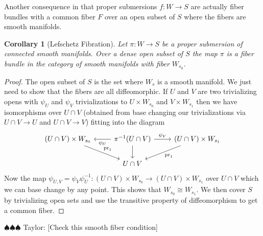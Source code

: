 \documentclass[12pt]{book}
\newcommand{\taylor}[1]{{\color{blue} \sf $\spadesuit\spadesuit\spadesuit$ Taylor: [#1]}}
\numberwithin{equation}{section}
\newtheorem{corollary}[theorem]{Corollary}
\theoremstyle{definition}
\theoremstyle{remark}
\newcommand{\pr}{\operatorname{pr}}
\begin{document}
Another consequence in that proper submersions $f:W \to S$ are actually fiber bundles with a common fiber $F$ over an open subset of $S$ where the fibers are smooth manifolds. 
\begin{corollary}[Lefschetz Fibration]
	Let $\pi:W\to S$ be a proper submersion of connected smooth manifolds. 
	Over a dense open subset of $S$ the map $\pi$ is a fiber bundle in the category of smooth manifolds with fiber $W_{s_0}$. 
\end{corollary}
\begin{proof}
	The open subset of $S$ is the set where $W_{s}$ is a smooth manifold. 
	We just need to show that the fibers are all diffeomorphic. 
	If $U$ and $V$ are two trivializing opens with $\psi_U$ and $\psi_V$ trivializations to $U\times W_{s_0}$ and $V \times W_{s_1}$ then we have isomorphisms over $U\cap V$ (obtained from base changing our trivializations via $U\cap V \to U$ and $U\cap V \to V$) 
	fitting into the diagram
	$$\begin{tikzcd}
	(U\cap V) \times W_{s_0} \ar[dr,"\pr_1"]&\pi^{-1}(U\cap V)\ar[d] \ar[r, "\psi_V"]  \ar[l, "\psi_U"]  & (U\cap V)\times W_{s_1} \ar[dl,"\pr_1"]\\
	& U \cap V &
	\end{tikzcd}
	$$
	Now the map $\psi_{U,V} = \psi_V\psi_U^{-1}:( U\cap V)\times W_{s_0} \to (U\cap V)\times W_{s_1}$ over $U\cap V$ which we can base change by any point. 
	This shows that $W_{s_0} \cong W_{s_1}$. 
	We then cover $S$ by trivializing open sets and use the transitive property of diffeomorphism to get a common fiber. 
\end{proof}

\taylor{Check this smooth fiber condition}



\backmatter





\end{document}
